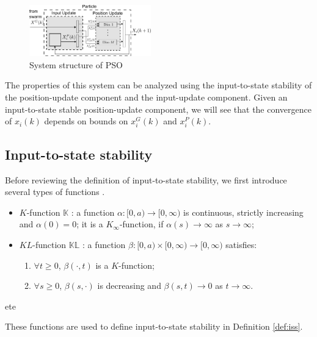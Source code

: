 \documentclass{sig-alternate}
\begin{document}
\begin{figure}
	\centering
	\includegraphics[width=0.47\textwidth]{particle_sys_flow.pdf}
	\caption{System structure of PSO}
	\label{fig:sys_flow}
\end{figure}

The properties of this system can be analyzed using the input-to-state stability of the position-update component and the input-update component. 
Given an input-to-state stable position-update component, we will see that the convergence of $ x_{i}(k) $ depends on bounds on $ x^{G}_{i}(k) $ and $ x^{P}_{i}(k) $.

\subsection{Input-to-state stability}
\label{sec:def_iss}

Before reviewing the definition of input-to-state stability, we first introduce several types of functions \cite{Jiang2001857}.
\begin{itemize}
	\item $ K $-function $ \mathbb{K} $ : a function $ \alpha  : [ 0, a ) \rightarrow [ 0, \infty ) $ is continuous, strictly increasing and $ \alpha (0) = 0 $; it is a $ K_{\infty} $-function, if $ \alpha (s) \rightarrow \infty $ as $ s \rightarrow \infty $;
	\item $ KL $-function $ \mathbb{KL} $ : a function $ \beta : [ 0, a ) \times [ 0 , \infty ) \rightarrow [ 0, \infty ) $ satisfies:
	\begin{enumerate}
		\item $ \forall t \geq 0 $, $ \beta (\cdot , t ) $ is a $ K $-function;
		\item $ \forall s \geq 0 $, $ \beta (s, \cdot) $ is decreasing and $ \beta(s,t) \rightarrow 0 $ as $ t \rightarrow \infty $.
	\end{enumerate}
\end{itemize}ete

These functions are used to define input-to-state stability in Definition \ref{def:iss}.
\end{document}
